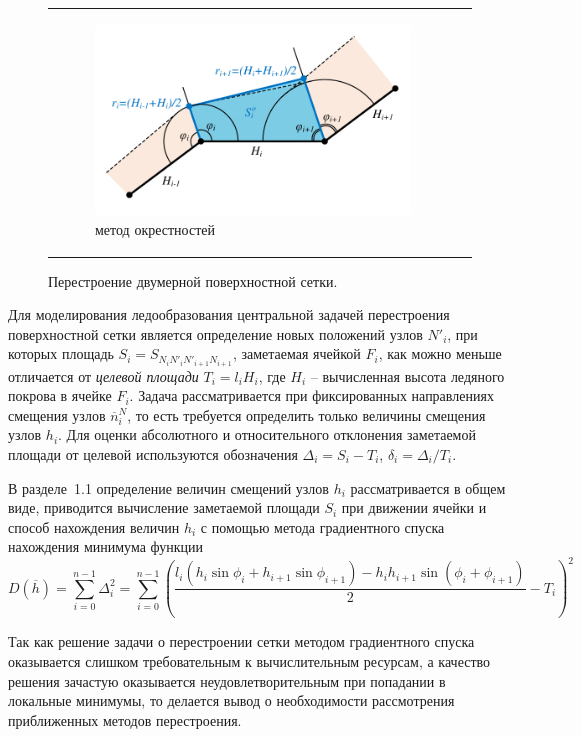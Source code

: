 \documentclass[a4paper,14pt]{extarticle}                     %
\theoremstyle{plain}                                         %
\begin{document}
\begin{figure}[ht]
\begin{tabular}{ll}
\begin{subfigure}{0.45\textwidth}\centering\includegraphics[width=0.75\columnwidth]{fig/2dr_remesh_okrestnost.pdf}\caption{метод окрестностей}\end{subfigure}
\end{tabular}
\singlespacing
\caption{Перестроение двумерной поверхностной сетки.}
\label{fig:remesh_2d}
\end{figure}

Для моделирования ледообразования центральной задачей перестроения поверхностной сетки является определение новых положений узлов $N'_i$, при которых площадь $S_i = S_{N_iN'_iN'_{i+1}N_{i+1}}$, заметаемая ячейкой $F_i$, как можно меньше отличается от \textit{целевой площади} $T_i = l_i H_i$, где $H_i$ -- вычисленная высота ледяного покрова в ячейке $F_i$.
Задача рассматривается при фиксированных направлениях смещения узлов $\overline{n}_i^N$, то есть требуется определить только величины смещения узлов $h_i$.
Для оценки абсолютного и относительного отклонения заметаемой площади от целевой используются обозначения $\Delta_i = S_i - T_i$, $\delta_i = \Delta_i / T_i$.


В разделе~1.1 определение величин смещений узлов $h_i$ рассматривается в общем виде, приводится вычисление заметаемой площади $S_i$ при движении ячейки и способ нахождения величин $h_i$ с помощью метода градиентного спуска нахождения минимума функции
\begin{equation*}
	D(\overline{h}) = \sum_{i = 0}^{n - 1}{\Delta_i^2} = \sum_{i = 0}^{n - 1}{ \left( \frac{ l_i(h_i \sin \phi_i + h_{i + 1} \sin \phi_{i+1}) - h_ih_{i + 1} \sin(\phi_i + \phi_{i+1}) }{2} - T_i \right)^2}
\end{equation*}

Так как решение задачи о перестроении сетки методом градиентного спуска оказывается слишком требовательным к вычислительным ресурсам, а качество решения зачастую оказывается неудовлетворительным при попадании в локальные минимумы, то делается вывод о необходимости рассмотрения приближенных методов перестроения.
\end{document}
